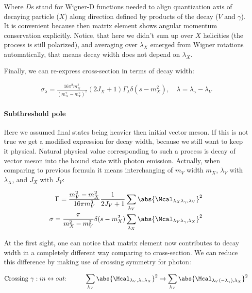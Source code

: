 Where $D$s stand for Wigner-D functions needed to align quantization axis of decaying particle ($X$) along direction defined by products of the decay ($V$ and $\gamma$). It is convenient because then matrix element shows angular momentum conservation explicitly. Notice, that here we didn't sum up over $X$ helicities (the process is still polarized), and averaging over $\lambda_X$ emerged from Wigner rotations automatically, that means decay width does not depend on $\lambda_X$.

Finally, we can re-express cross-section in terms of decay width:

\begin{align} \label{eq:app:crsc-dw}
    \sigma_{\lambda} = \frac{16 \pi^2 m_X^3}{(m_X^2 - m_V^2)^2} (2J_X + 1) \Gamma_{\lambda} \delta(s - m_X^2),\quad \lambda = \lambda_\gamma - \lambda_V
\end{align}

\paragraph{Subthreshold pole} Here we assumed final states being heavier then initial vector meson. If this is not true we get a modified expression for decay width, because we still want to keep it physical. Natural physical value corresponding to such a process is decay of vector meson into the bound state with photon emission. Actually, when comparing to previous formula it means interchanging of $m_V$ width $m_X$, $\lambda_V$ with $\lambda_X$, and $J_X$ with $J_V$:

\begin{align}
        \Gamma = \frac{m_V^2 - m_X^2}{16 \pi m_V^3} \frac{1}{2J_V + 1} \sum_{\lambda_V} \abs{\Mcal_{\lambda_X \lambda_\gamma, \lambda_V}}^2 \\
        \sigma = \frac{\pi}{m_X^2 - m_V^2} \delta(s - m_X^2) \sum_{\lambda_X} \abs{\Mcal_{\lambda_V \lambda_\gamma, \lambda_X}}^2
\end{align}

At the first sight, one can notice that matrix element now contributes to decay width in a completely different way comparing to cross-section. We can reduce this difference by making use of crossing symmetry for photon:

\begin{align}
    &\text{Crossing $\gamma: in \leftrightarrow out$:}\qquad &\sum_{\lambda_V} \abs{\Mcal_{\lambda_V, \lambda_\gamma \lambda_X}}^2 \rightarrow \sum_{\lambda_V} \abs{\Mcal_{\lambda_V (-\lambda_\gamma), \lambda_X}}^2 \\
\end{align}

